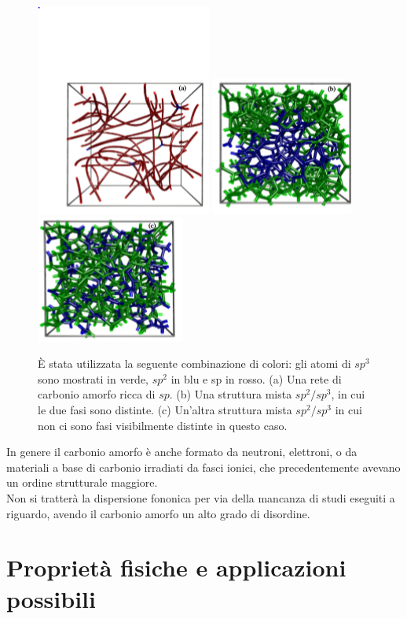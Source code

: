 \documentclass[a4paper,titlepage]{book}
\begin{document}
\begin{figure}[h!]
	\centering
	\includegraphics[width=.35\textwidth]{Amorph.png}\hfil
	\includegraphics[width=.3\textwidth]{Amorph1.png}\hfil
	\includegraphics[width=.35\textwidth]{Amorph2.png}
	
	\caption{È stata utilizzata la seguente combinazione di colori: gli atomi di $sp^3$ sono mostrati in verde, $sp^2$ in blu e sp in rosso. (a) Una rete di carbonio amorfo  ricca di $sp$. (b) Una struttura mista $sp^2 / sp^3$, in cui le due fasi sono distinte. (c) Un'altra struttura mista $sp^2 / sp^3$ in cui non ci sono fasi visibilmente distinte in questo caso.}\label{yaas}
\end{figure}
In genere il carbonio amorfo è anche formato da neutroni, elettroni, o da materiali a base di carbonio irradiati da fasci ionici, che precedentemente avevano un ordine strutturale maggiore.\\

Non si tratterà la dispersione fononica per via della mancanza di studi eseguiti a riguardo, avendo il carbonio amorfo un alto grado di disordine.
\section{Proprietà fisiche e applicazioni possibili}
\end{document}
